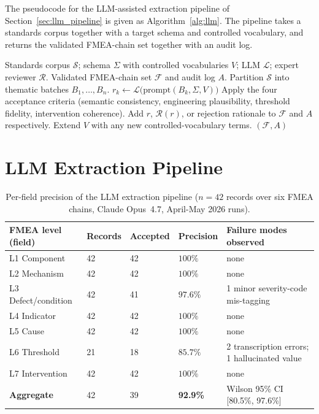 \documentclass[11pt,a4paper]{article}
\begin{document}
The pseudocode for the LLM-assisted extraction pipeline of
Section~\ref{sec:llm_pipeline} is given as
Algorithm~\ref{alg:llm}. The pipeline takes a standards corpus
together with a target schema and controlled vocabulary, and
returns the validated FMEA-chain set together with an audit log.

\begin{algorithm}[htbp]
\caption{Schema-guided FMEA extraction with expert validation.}
\label{alg:llm}
\begin{algorithmic}[1]
\Require Standards corpus $\mathcal{S}$; schema $\Sigma$ with
  controlled vocabularies $V$; LLM $\mathcal{L}$; expert reviewer
  $\mathcal{R}$.
\Ensure Validated FMEA-chain set $\mathcal{F}$ and audit log $A$.
\State Partition $\mathcal{S}$ into thematic batches
  $B_1,\dots,B_n$.
  \State $r_k \leftarrow \mathcal{L}\bigl(\text{prompt}(B_k,
    \Sigma,V)\bigr)$
    \State Apply the four acceptance criteria (semantic
      consistency, engineering plausibility, threshold fidelity,
      intervention coherence).
    \State Add $r$, $\mathcal{R}(r)$, or rejection rationale to
      $\mathcal{F}$ and $A$ respectively.
  \EndFor
  \State Extend $V$ with any new controlled-vocabulary terms.
\EndFor
\State \Return $(\mathcal{F}, A)$
\end{algorithmic}
\end{algorithm}

\section{LLM Extraction Pipeline}
\label{app:precision}

\begin{table}[htbp]
\centering
\caption{Per-field precision of the LLM extraction pipeline
  ($n=42$ records over six FMEA chains, Claude Opus~4.7,
  April-May 2026 runs).}
\label{tab:precision}
\begin{tabularx}{\textwidth}{p{3.4cm} p{1.4cm} p{1.4cm} p{1.6cm} X}
\toprule
\textbf{FMEA level (field)} & \textbf{Records} & \textbf{Accepted} &
  \textbf{Precision} & \textbf{Failure modes observed} \\
\midrule
L1 Component       & 42 & 42 & $100\%$ & none \\
L2 Mechanism       & 42 & 42 & $100\%$ & none \\
L3 Defect/condition & 42 & 41 & $97.6\%$ & 1 minor severity-code
  mis-tagging \\
L4 Indicator       & 42 & 42 & $100\%$ & none \\
L5 Cause           & 42 & 42 & $100\%$ & none \\
L6 Threshold       & 21 & 18 & $85.7\%$ & 2 transcription errors;
  1 hallucinated value \\
L7 Intervention    & 42 & 42 & $100\%$ & none \\
\midrule
\textbf{Aggregate} & 42 & 39 & \textbf{92.9\%} &
  Wilson 95\% CI [80.5\%, 97.6\%] \\
\bottomrule
\end{tabularx}
\end{table}
\end{document}
